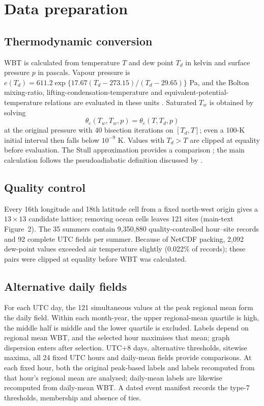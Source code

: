 \section{Data preparation}
\label{sec:data-preparation}

\subsection{Thermodynamic conversion}

WBT is calculated from temperature $T$ and dew point $T_d$ in kelvin and
surface pressure $p$ in pascals. Vapour pressure is
$e(T_d)=611.2\exp\{17.67(T_d-273.15)/(T_d-29.65)\}$ Pa, and the Bolton
mixing-ratio, lifting-condensation-temperature and equivalent-potential-
temperature relations are evaluated in these units \citep{bolton1980}.
Saturated $T_w$ is obtained by solving
\begin{equation}
  \theta_e(T_w,T_w,p)=\theta_e(T,T_d,p)
  \label{eq:wbt}
\end{equation}
at the original pressure with 40 bisection iterations on
$[T_d,T]$; even a 100-K initial interval then falls below $10^{-9}$ K. Values
with $T_d>T$ are clipped at equality before evaluation. The Stull approximation
provides a comparison \citep{stull2011}; the main calculation follows the
pseudoadiabatic definition discussed by \citet{davies2008}.


\subsection{Quality control}

Every 16th longitude and 18th latitude cell from a fixed north-west origin
gives a $13\times13$ candidate lattice; removing ocean cells leaves 121 sites
(main-text Figure~2). The 35 summers contain 9,350,880
quality-controlled hour--site records and 92 complete UTC fields per summer.
Because of NetCDF packing, 2,092 dew-point values exceeded air temperature
slightly (0.022\% of records); these pairs were clipped at equality before WBT
was calculated.

\subsection{Alternative daily fields}

For each UTC day, the 121 simultaneous values at the peak regional mean form
the daily field. Within each month-year, the upper regional-mean quartile is
high, the middle half is middle and the lower quartile is excluded. Labels
depend on regional mean WBT, and the selected hour maximises that mean; graph
dispersion enters after selection. UTC+8 days,
alternative thresholds, sitewise maxima, all 24 fixed UTC hours and daily-mean
fields provide comparisons. At each fixed hour, both the original
peak-based labels and labels recomputed from that hour's regional mean are
analysed; daily-mean labels are likewise recomputed from daily-mean WBT\@. A
dated event manifest records the type-7 thresholds, membership and absence of
ties.

